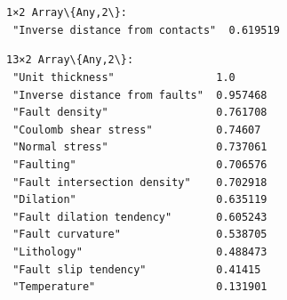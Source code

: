 \documentclass[11pt]{article}
\begin{document}
    \begin{center}
    \end{center}
    { \hspace*{\fill} \\}
    
    \begin{Verbatim}[commandchars=\\\{\}]

    \end{Verbatim}

    \begin{center}
    \end{center}
    { \hspace*{\fill} \\}
    
    \begin{Verbatim}[commandchars=\\\{\}]

    \end{Verbatim}

    
    \begin{Verbatim}[commandchars=\\\{\}]
1×2 Array\{Any,2\}:
 "Inverse distance from contacts"  0.619519
    \end{Verbatim}

    
    
    \begin{Verbatim}[commandchars=\\\{\}]
13×2 Array\{Any,2\}:
 "Unit thickness"                1.0
 "Inverse distance from faults"  0.957468
 "Fault density"                 0.761708
 "Coulomb shear stress"          0.74607
 "Normal stress"                 0.737061
 "Faulting"                      0.706576
 "Fault intersection density"    0.702918
 "Dilation"                      0.635119
 "Fault dilation tendency"       0.605243
 "Fault curvature"               0.538705
 "Lithology"                     0.488473
 "Fault slip tendency"           0.41415
 "Temperature"                   0.131901
    \end{Verbatim}

    
    \begin{center}
    \end{center}
    { \hspace*{\fill} \\}
    
\end{document}
